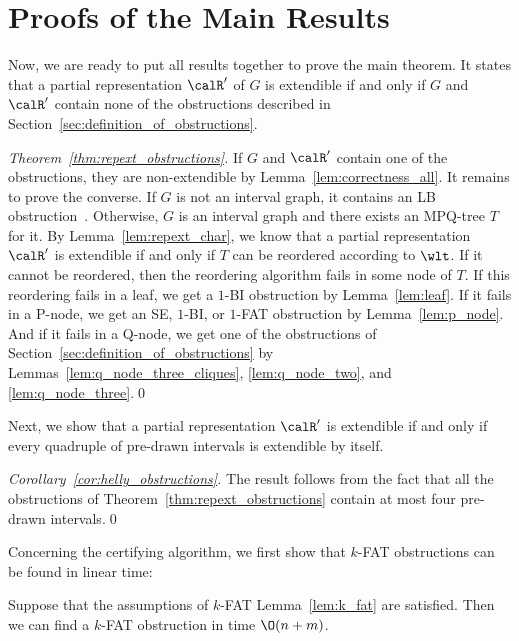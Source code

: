 \section{Proofs of the Main Results} \label{sec:main_result}

Now, we are ready to put all results together to prove the main theorem. It states that a partial
representation $\calR'$ of $G$ is extendible if and only if $G$ and $\calR'$ contain none of the
obstructions described in Section~\ref{sec:definition_of_obstructions}.

\begin{proof}[Theorem~\ref{thm:repext_obstructions}]
If $G$ and $\calR'$ contain one of the obstructions, they are non-extendible by
Lemma~\ref{lem:correctness_all}. It remains to prove the converse. If $G$ is not an interval graph,
it contains an LB obstruction~\cite{lb_graphs}. Otherwise, $G$ is an interval graph and there exists
an MPQ-tree $T$ for it. By Lemma~\ref{lem:repext_char}, we know that a partial representation
$\calR'$ is extendible if and only if $T$ can be reordered according to $\wlt$. If it cannot be
reordered, then the reordering algorithm fails in some node of $T$. If this reordering fails in a
leaf, we get a $1$-BI obstruction by Lemma~\ref{lem:leaf}. If it fails in a P-node, we get an SE,
$1$-BI, or $1$-FAT obstruction by Lemma~\ref{lem:p_node}. And if it fails in a Q-node, we get one of
the obstructions of Section~\ref{sec:definition_of_obstructions} by
Lemmas~\ref{lem:q_node_three_cliques}, \ref{lem:q_node_two}, and \ref{lem:q_node_three}.\qed
\end{proof}

Next, we show that a partial representation $\calR'$ is extendible if and only if every quadruple of
pre-drawn intervals is extendible by itself.

\begin{proof}[Corollary~\ref{cor:helly_obstructions}]
The result follows from the fact that all the obstructions of Theorem~\ref{thm:repext_obstructions}
contain at most four pre-drawn intervals.\qed
\end{proof}

Concerning the certifying algorithm, we first show that $k$-FAT obstructions can be found in linear
time:

\begin{lemma} \label{lem:computing_k_fat}
Suppose that the assumptions of $k$-FAT Lemma~\ref{lem:k_fat} are satisfied. Then we can find a
$k$-FAT obstruction in time $\O(n+m)$.
\end{lemma}

